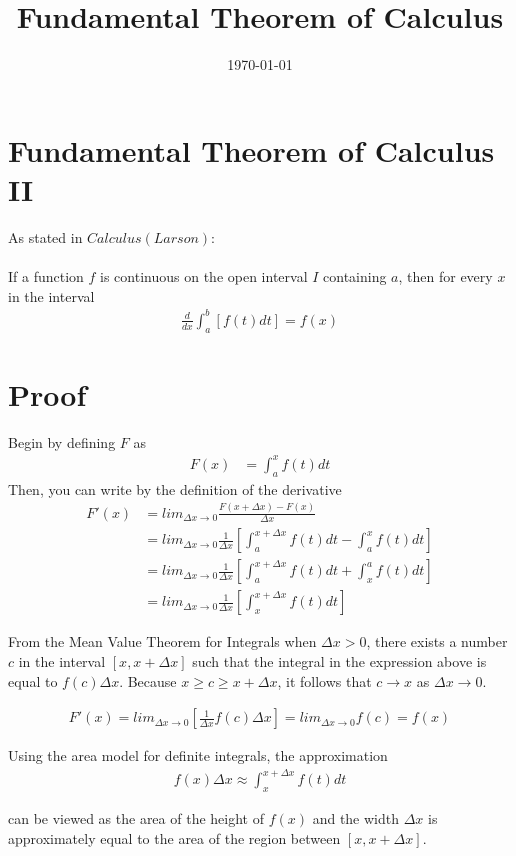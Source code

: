 \documentclass[a4paper, 12pt]{article}
\begin{document}
\title{Fundamental Theorem of Calculus}
\date{\today}
\pagestyle{empty} 
\section{Fundamental Theorem of Calculus II}
	
As stated in $Calculus(Larson)$:	\\
\\
	If a function $f$ is continuous on the open interval $I$ containing $a$, then for every $x$ in the interval
\begin{align}
	\frac{d}{dx} \int_a^b [f(t) dt] = f(x)
\end{align}
\section{Proof}
	Begin by defining $F$ as
\begin{align}
	F(x) &= \int_a^x f(t) dt
\end{align}
	Then, you can write by the definition of the derivative
\begin{align*}
	F'(x) &= lim_{\Delta x \to 0} \frac{F(x + \Delta x) - F(x)}{\Delta x} \\
		  &= lim_{\Delta x \to 0} \frac{1}{\Delta x} [\int_{a}^{x + \Delta x} f(t) dt - \int_a^x f(t) dt ] \\
		  &=  lim_{\Delta x \to 0} \frac{1}{\Delta x} [\int_{a}^{x + \Delta x} f(t) dt + \int_x^a f(t) dt ] \\
		  &=  lim_{\Delta x \to 0} \frac{1}{\Delta x} [\int_{x}^{x + \Delta x} f(t) dt]
\end{align*}

	From the Mean Value Theorem for Integrals when $\Delta x > 0$, there exists a number $c$ in the interval $[x, x + \Delta x]$ such that the integral in the expression above is equal to $f(c) \Delta x$.  Because $x \geq c \geq x + \Delta x$, it follows that $c \to x$ as $\Delta x \to 0$.
	
\begin{align*}
	F'(x) = lim_{\Delta x \to 0} [\frac{1}{\Delta x} f(c) \Delta x ] = lim_{\Delta x \to 0} f(c) = f(x)
\end{align*}

	Using the area model for definite integrals, the approximation
\begin{align}
	f(x) \Delta x \approx \int_{x}^{x + \Delta x} f(t) dt
\end{align}	

	can be viewed as the area of the height of $f(x)$ and the width $\Delta x$ is approximately equal to the area of the region between $[x, x + \Delta x]$.
\end{document}
